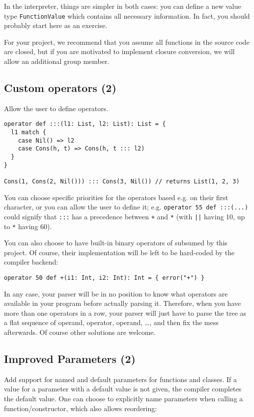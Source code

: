 In the interpreter, things are simpler in both cases:
you can define a new value type \lstinline{FunctionValue}
which contains all necessary information.
In fact, you should probably start here as an exercise.

For your project, we recommend that you assume
all functions in the source code are closed,
but if you are motivated to implement closure conversion,
we will allow an additional group member.

\subsection{Custom operators (2)}
Allow the user to define operators.

\begin{lstlisting}
operator def :::(l1: List, l2: List): List = {
  l1 match {
    case Nil() => l2
    case Cons(h, t) => Cons(h, t ::: l2)
  }
}

Cons(1, Cons(2, Nil())) ::: Cons(3, Nil()) // returns List(1, 2, 3)
\end{lstlisting}

You can choose specific priorities for the operators based e.g. on their first character,
or you can allow the user to define it;
e.g. \lstinline{operator 55 def :::(...)} could signify
that \lstinline{:::} has a precedence between \lstinline{+} and \lstinline{*}
(with \lstinline{||} having 10, up to \lstinline{*} having 60).

You can also choose to have built-in binary operators of \langname
subsumed by this project. Of course, their implementation
will be left to be hard-coded by the compiler backend:

\begin{lstlisting}
operator 50 def +(i1: Int, i2: Int): Int = { error("+") }
\end{lstlisting}

In any case, your parser will be in no position to know
what operators are available in your program before actually parsing it.
Therefore, when you have more than one operators in a row,
your parser will just have to parse the tree as a flat sequence
of operand, operator, operand, \ldots,
and then fix the mess afterwards.
Of course other solutions are welcome.

\subsection{Improved Parameters (2)}

Add support for named and default parameters for functions and classes.
If a value for a parameter with a default value is not given,
the compiler completes the default value.
One can choose to explicitly name parameters when calling a function/constructor,
which also allows reordering:

